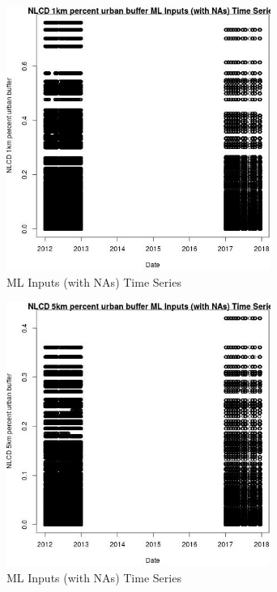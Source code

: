 \begin{figure} 
\centering  
\includegraphics[width=0.77\textwidth]{Code_Outputs/Report_ML_input_PM25_Step4_part_e_de_duplicated_aves_compiled_2019-05-14wNAs_NLCD_1km_percent_urban_buffervDate.jpg} 
\caption{\label{fig:Report_ML_input_PM25_Step4_part_e_de_duplicated_aves_compiled_2019-05-14wNAsNLCD_1km_percent_urban_buffervDate}ML Inputs (with NAs) Time Series} 
\end{figure} 
 

\clearpage 

\begin{figure} 
\centering  
\includegraphics[width=0.77\textwidth]{Code_Outputs/Report_ML_input_PM25_Step4_part_e_de_duplicated_aves_compiled_2019-05-14wNAs_NLCD_5km_percent_urban_buffervDate.jpg} 
\caption{\label{fig:Report_ML_input_PM25_Step4_part_e_de_duplicated_aves_compiled_2019-05-14wNAsNLCD_5km_percent_urban_buffervDate}ML Inputs (with NAs) Time Series} 
\end{figure} 
 

